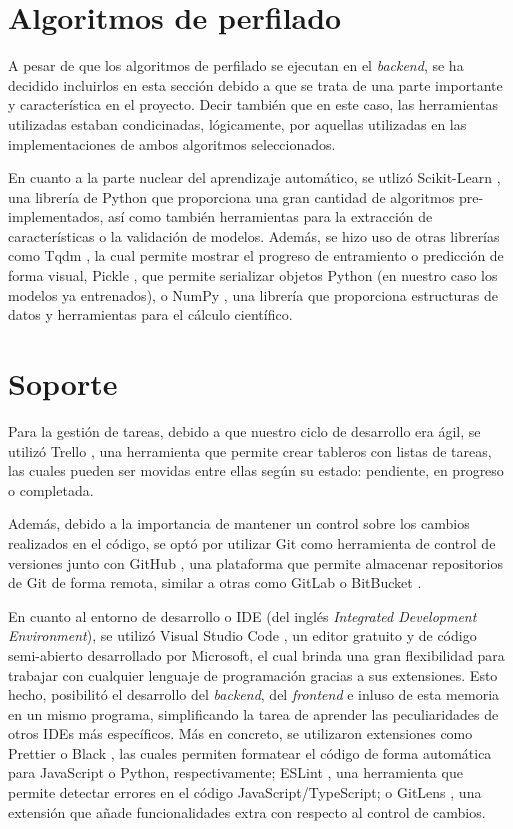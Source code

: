 \section{Algoritmos de perfilado}
\label{sec:herramientas_algoritmos}

A pesar de que los algoritmos de perfilado se ejecutan en el \textit{backend}, se ha decidido incluirlos en esta sección debido a que se trata de una parte
importante y característica en el proyecto. Decir también que en este caso, las herramientas utilizadas estaban condicinadas, lógicamente,
por aquellas utilizadas en las implementaciones de ambos algoritmos seleccionados.

\bigskip
En cuanto a la parte nuclear del aprendizaje automático, se utlizó Scikit-Learn \cite{scikitlearn}, una librería de Python que proporciona una gran cantidad
de algoritmos pre-implementados, así como también herramientas para la extracción de características o la validación de modelos. Además, se hizo uso
de otras librerías como Tqdm \cite{tqdm}, la cual permite mostrar el progreso de entramiento o predicción de forma visual, Pickle \cite{pickle}, que permite
serializar objetos Python (en nuestro caso los modelos ya entrenados), o NumPy \cite{numpy}, una librería que proporciona estructuras de datos y herramientas para el cálculo científico.

\section{Soporte}
\label{sec:herramientas_soporte}

Para la gestión de tareas, debido a que nuestro ciclo de desarrollo era ágil, se utilizó Trello \cite{trello}, una herramienta que permite crear tableros con listas de tareas, las cuales pueden ser movidas
entre ellas según su estado: pendiente, en progreso o completada. 

\bigskip
Además, debido a la importancia de mantener un control sobre los cambios realizados en el código, se optó por utilizar Git \cite{git} como herramienta de control de versiones junto con GitHub \cite{github}, una plataforma que permite
almacenar repositorios de Git de forma remota, similar a otras como GitLab \cite{gitlab} o BitBucket \cite{bitbucket}.

\bigskip
En cuanto al entorno de desarrollo o IDE (del inglés \textit{Integrated Development Environment}), se utilizó Visual Studio Code \cite{vscode}, un editor gratuito y de código semi-abierto desarrollado por Microsoft, el cual
brinda una gran flexibilidad para trabajar con cualquier lenguaje de programación gracias a sus extensiones. Esto hecho, posibilitó el desarrollo
del \textit{backend}, del \textit{frontend} e inluso de esta memoria en un mismo programa, simplificando la tarea de aprender las peculiaridades de
otros IDEs más específicos. Más en concreto, se utilizaron extensiones como Prettier \cite{prettier} o Black \cite{blackformatter}, las cuales permiten formatear el código de forma automática para JavaScript o Python, respectivamente;
ESLint \cite{eslint}, una herramienta que permite detectar errores en el código JavaScript/TypeScript; o GitLens \cite{gitlens}, una extensión que añade funcionalidades extra con respecto
al control de cambios.

